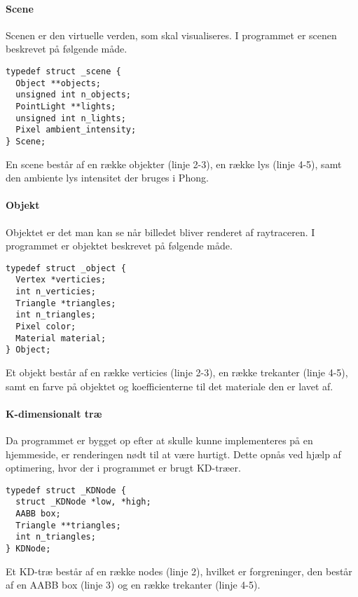 \paragraph{Scene}
Scenen er den virtuelle verden, som skal visualiseres. I programmet er scenen beskrevet på følgende måde. 

\begin{lstlisting}[style=Cstyle, caption=Struct til scene]
typedef struct _scene {
  Object **objects;
  unsigned int n_objects;
  PointLight **lights;
  unsigned int n_lights;
  Pixel ambient_intensity;
} Scene; 
\end{lstlisting}

En scene består af en række objekter (linje 2-3), en række lys (linje 4-5), samt den ambiente lys intensitet der bruges i Phong.

\paragraph{Objekt}
Objektet er det man kan se når billedet bliver renderet af raytraceren. I programmet er objektet beskrevet på følgende måde.

\begin{lstlisting}[style=Cstyle, caption=Structs til objektet]
typedef struct _object {
  Vertex *verticies;
  int n_verticies;
  Triangle *triangles;
  int n_triangles;
  Pixel color;
  Material material;
} Object;
\end{lstlisting}

Et objekt består af en række verticies (linje 2-3), en række trekanter (linje 4-5), samt en farve på objektet og koefficienterne til det materiale den er lavet af.

\paragraph{K-dimensionalt træ}
Da programmet er bygget op efter at skulle kunne implementeres på en hjemmeside, er renderingen nødt til at være hurtigt. Dette opnås ved hjælp af optimering, hvor der i programmet er brugt KD-træer.

\begin{lstlisting}[style=Cstyle, caption=Struct til KDNode]
typedef struct _KDNode {
  struct _KDNode *low, *high;
  AABB box;
  Triangle **triangles;
  int n_triangles;
} KDNode;
\end{lstlisting}

Et KD-træ består af en række nodes (linje 2), hvilket er forgreninger, den består af en AABB box (linje 3) og en række trekanter (linje 4-5).